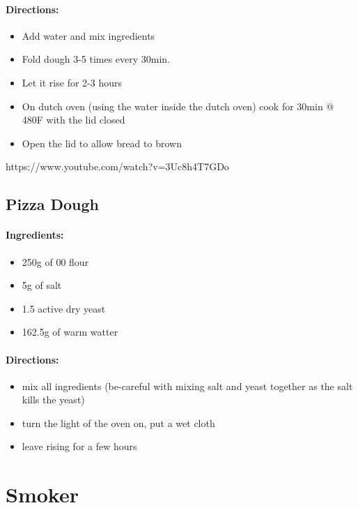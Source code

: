 \documentclass{article}
\begin{document}
\paragraph{Directions:}
\begin{itemize}
	\item Add water and mix ingredients
	\item Fold dough 3-5 times every 30min.
	\item Let it rise for 2-3 hours
	\item On dutch oven (using the water inside the dutch oven) cook for 30min @ 480F with the lid closed
	\item Open the lid to allow bread to brown
\end{itemize}

https://www.youtube.com/watch?v=3Uc8h4T7GDo

\subsection{Pizza Dough}


\paragraph{Ingredients:}

\begin{itemize}
	\item 250g of 00 flour
	\item 5g of salt
	\item 1.5 active dry yeast
	\item 162.5g of warm watter
\end{itemize}


\paragraph{Directions:}
\begin{itemize}
	\item mix all ingredients (be-careful with mixing salt and yeast together as the salt kills the yeast)
	\item turn the light of the oven on, put a wet cloth
	\item leave rising for a few hours
\end{itemize}

\section{Smoker}
\end{document}
